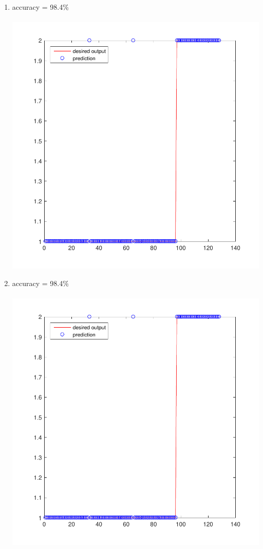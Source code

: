 \documentclass[12pt,a4paper]{article}
\begin{document}
\begin{CJK}{UTF8}{bsmi}
\begin{enumerate}
\begin{enumerate}
\begin{enumerate}
		\begin{enumerate}
			\item accuracy = 98.4\%\\\
			\includegraphics[scale=0.6]{breasthh1}
			\newpage	
			\item accuracy = 98.4\%\\\
			\includegraphics[scale=0.6]{breasthh1}	

\end{enumerate}
\end{enumerate}
\end{enumerate}
\end{enumerate}
\end{CJK}
\end{document}

